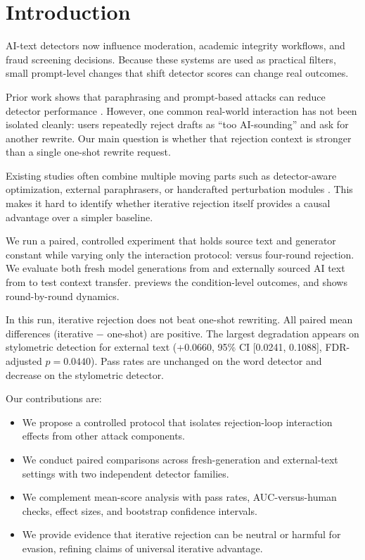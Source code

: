 \section{Introduction}
\label{sec:introduction}
AI-text detectors now influence moderation, academic integrity workflows, and fraud screening decisions. Because these systems are used as practical filters, small prompt-level changes that shift detector scores can change real outcomes.

 Prior work shows that paraphrasing and prompt-based attacks can reduce detector performance \cite{krishna2023paraphrasing,lu2024guided,zhou2024humanizing}. However, one common real-world interaction has not been isolated cleanly: users repeatedly reject drafts as ``too AI-sounding'' and ask for another rewrite. Our main question is whether that rejection context is stronger than a single one-shot rewrite request.

 Existing studies often combine multiple moving parts such as detector-aware optimization, external paraphrasers, or handcrafted perturbation modules \cite{krishna2023paraphrasing,lu2024guided,zhou2024humanizing}. This makes it hard to identify whether iterative rejection itself provides a causal advantage over a simpler baseline.

 We run a paired, controlled experiment that holds source text and generator constant while varying only the interaction protocol: \oneshot versus four-round \iterative rejection. We evaluate both fresh model generations from \hcthree and externally sourced AI text from \ghostbuster to test context transfer.  previews the condition-level outcomes, and  shows round-by-round dynamics.

 In this run, iterative rejection does not beat one-shot rewriting. All paired mean differences (iterative $-$ one-shot) are positive. The largest degradation appears on stylometric detection for external text (+0.0660, 95\% CI [0.0241, 0.1088], FDR-adjusted $p=0.0440$). Pass rates are unchanged on the word detector and decrease on the stylometric detector.

Our contributions are:
\begin{itemize}[leftmargin=*,itemsep=0pt,topsep=0pt]
    \item We propose a controlled protocol that isolates rejection-loop interaction effects from other attack components.
    \item We conduct paired comparisons across fresh-generation and external-text settings with two independent detector families.
    \item We complement mean-score analysis with pass rates, AUC-versus-human checks, effect sizes, and bootstrap confidence intervals.
    \item We provide evidence that iterative rejection can be neutral or harmful for evasion, refining claims of universal iterative advantage.
\end{itemize}

